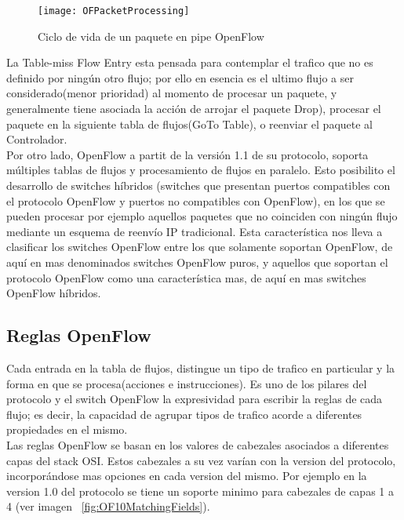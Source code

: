 \begin{figure}[htbp!] 
\centering    
\texttt{[image: OFPacketProcessing]}
\caption[Ciclo de vida de un paquete en pipe OpenFlow]{Ciclo de vida de un paquete en pipe OpenFlow}
\label{fig:OFPacketProcessing}
\end{figure}


La Table-miss Flow Entry esta pensada para contemplar el trafico que no es definido por ningún otro flujo; por ello en esencia es el ultimo flujo a ser considerado(menor prioridad) al momento de procesar un paquete, y generalmente tiene asociada la acción de arrojar el paquete Drop), procesar el paquete en la siguiente tabla de flujos(GoTo Table), o reenviar el paquete al Controlador.\\

Por otro lado, OpenFlow a partit de la versión 1.1 de su protocolo, soporta múltiples tablas de flujos y procesamiento de flujos en paralelo. Esto posibilito el desarrollo de switches híbridos (switches que presentan puertos compatibles con el protocolo OpenFlow y puertos no compatibles con OpenFlow), en los que se pueden procesar por ejemplo aquellos paquetes que no coinciden con ningún flujo mediante un esquema de reenvío IP tradicional. Esta característica nos lleva a clasificar los switches OpenFlow entre los que solamente soportan OpenFlow, de aquí en mas denominados switches OpenFlow puros, y aquellos que soportan el protocolo OpenFlow como una característica mas, de aquí en mas switches OpenFlow híbridos.

\subsection{Reglas OpenFlow}
Cada entrada en la tabla de flujos, distingue un tipo de trafico en particular y la forma en que se procesa(acciones e instrucciones). Es uno de los pilares del protocolo y el switch OpenFlow la expresividad para escribir la reglas de cada flujo; es decir, la capacidad de agrupar tipos de trafico acorde a diferentes propiedades en el mismo.\\

Las reglas OpenFlow se basan en los valores de cabezales asociados a diferentes capas del stack OSI. Estos cabezales a su vez varían con la version del protocolo, incorporándose mas opciones en cada version del mismo. Por ejemplo en la version 1.0 del protocolo se tiene un soporte minimo para cabezales de capas 1 a 4 (ver imagen ~\ref{fig:OF10MatchingFields}).

